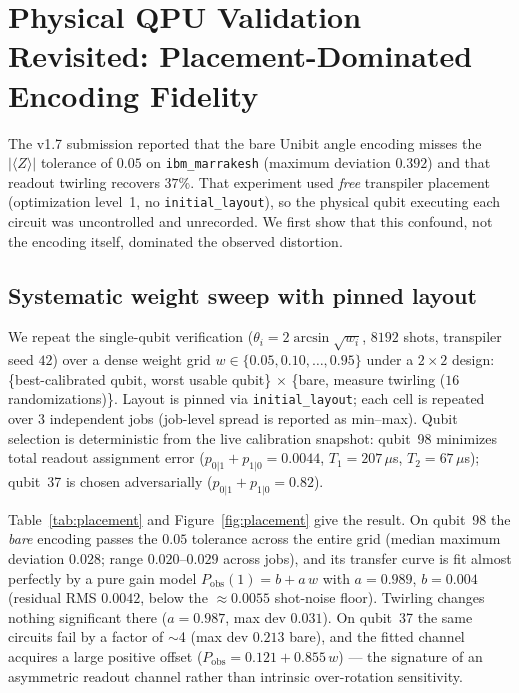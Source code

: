 ﻿%

\section{Physical QPU Validation Revisited: Placement-Dominated Encoding Fidelity}
\label{sec:qpu}

The v1.7 submission reported that the bare Unibit angle encoding misses the
$|\langle Z\rangle|$ tolerance of $0.05$ on \texttt{ibm\_marrakesh}
(maximum deviation $0.392$) and that readout twirling recovers $37\%$.
That experiment used \emph{free} transpiler placement
(optimization level~1, no \texttt{initial_layout}), so the physical qubit
executing each circuit was uncontrolled and unrecorded. We first show that
this confound, not the encoding itself, dominated the observed distortion.

\subsection{Systematic weight sweep with pinned layout}
\label{sec:sweep}

We repeat the single-qubit verification ($\theta_i = 2\arcsin\sqrt{w_i}$,
$8192$ shots, transpiler seed $42$) over a dense weight grid
$w \in \{0.05, 0.10, \ldots, 0.95\}$ under a $2\times 2$ design:
\{best-calibrated qubit, worst usable qubit\} $\times$ \{bare, measure
twirling ($16$ randomizations)\}. Layout is pinned via
\texttt{initial\_layout}; each cell is repeated over $3$ independent jobs
(job-level spread is reported as min--max). Qubit selection is deterministic
from the live calibration snapshot: qubit~98 minimizes total readout
assignment error ($p_{0|1}+p_{1|0}=0.0044$, $T_1=207\,\mu$s, $T_2=67\,\mu$s);
qubit~37 is chosen adversarially ($p_{0|1}+p_{1|0}=0.82$).

Table~\ref{tab:placement} and Figure~\ref{fig:placement} give the result.
On qubit~98 the \emph{bare} encoding passes the $0.05$ tolerance across the
entire grid (median maximum deviation $0.028$; range $0.020$--$0.029$
across jobs), and its transfer curve is fit almost perfectly by a pure gain
model $P_{\mathrm{obs}}(1) = b + a\,w$ with $a = 0.989$, $b = 0.004$
(residual RMS $0.0042$, below the $\approx 0.0055$ shot-noise floor).
Twirling changes nothing significant there ($a=0.987$, max dev $0.031$).
On qubit~37 the same circuits fail by a factor of $\sim$4
(max dev $0.213$ bare), and the fitted channel acquires a large positive
offset ($P_{\mathrm{obs}} = 0.121 + 0.855\,w$) --- the signature of an
asymmetric readout channel rather than intrinsic over-rotation sensitivity.

